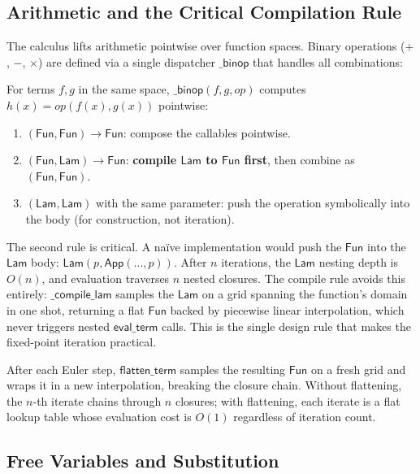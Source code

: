 \documentclass{lmcs}
\theoremstyle{plain}
\theoremstyle{definition}
\begin{document}
\subsection{Arithmetic and the Critical Compilation Rule}

The calculus lifts arithmetic pointwise over function spaces. Binary
operations ($+$, $-$, $\times$) are defined via a single dispatcher
$\mathsf{\_binop}$ that handles all combinations:

\begin{defi}
For terms $f, g$ in the same space, $\mathsf{\_binop}(f, g, op)$
computes $h(x) = op(f(x), g(x))$ pointwise:
\begin{enumerate}
\item $(\mathsf{Fun}, \mathsf{Fun}) \to \mathsf{Fun}$: compose the callables
  pointwise.
\item $(\mathsf{Fun}, \mathsf{Lam}) \to \mathsf{Fun}$: \textbf{compile
  $\mathsf{Lam}$ to $\mathsf{Fun}$ first}, then combine as
  $(\mathsf{Fun}, \mathsf{Fun})$.
\item $(\mathsf{Lam}, \mathsf{Lam})$ with the same parameter: push the
  operation symbolically into the body (for construction, not iteration).
\end{enumerate}
\end{defi}

The second rule is critical. A na\"ive implementation would push the
$\mathsf{Fun}$ into the $\mathsf{Lam}$ body:
$\mathsf{Lam}(p, \mathsf{App}(\dots, p))$. After $n$ iterations, the
$\mathsf{Lam}$ nesting depth is $O(n)$, and evaluation traverses $n$ nested
closures. The compile rule avoids this entirely: $\mathsf{\_compile\_lam}$
samples the $\mathsf{Lam}$ on a grid spanning the function's domain in one
shot, returning a flat $\mathsf{Fun}$ backed by piecewise linear
interpolation, which never triggers nested $\mathsf{eval\_term}$ calls. This
is the single design rule that makes the fixed-point iteration practical.

After each Euler step, $\mathsf{flatten\_term}$ samples the resulting
$\mathsf{Fun}$ on a fresh grid and wraps it in a new interpolation, breaking
the closure chain. Without flattening, the $n$-th iterate chains through $n$
closures; with flattening, each iterate is a flat lookup table whose
evaluation cost is $O(1)$ regardless of iteration count.

\subsection{Free Variables and Substitution}
\end{document}
